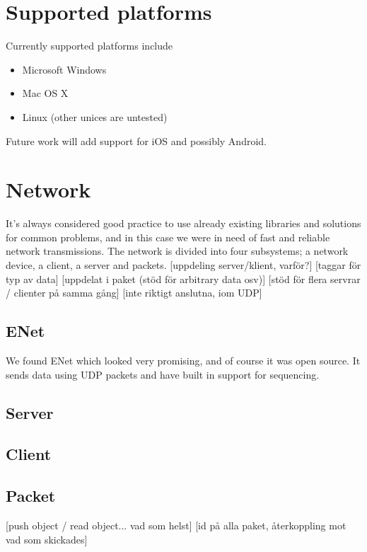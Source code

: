 \section{Supported platforms}
Currently supported platforms include
\begin{itemize}
\item Microsoft Windows
\item Mac OS X
\item Linux (other unices are untested)
\end{itemize}
Future work will add support for iOS and possibly Android.

\section{Network}
It's always considered good practice to use already existing libraries and solutions for common problems, and in this case we were in need of fast and reliable network transmissions.
The network is divided into four subsystems; a network device, a client, a server and packets.
[uppdeling server/klient, varför?]
[taggar för typ av data]
[uppdelat i paket (stöd för arbitrary data osv)]
[stöd för flera servrar / clienter på samma gång]
[inte riktigt anslutna, iom UDP]
\subsection{ENet}
We found ENet which looked very promising, and of course it was open source. It sends data using UDP packets and have built in support for sequencing.
\subsection{Server}
\subsection{Client}
\subsection{Packet}
[push object / read object... vad som helst]
[id på alla paket, återkoppling mot vad som skickades]

